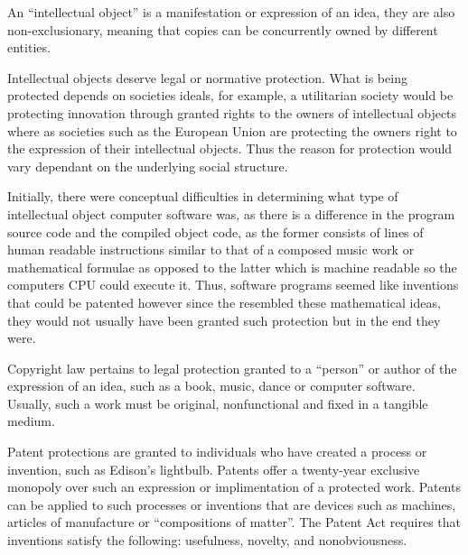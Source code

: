 An ``intellectual object'' is a manifestation or expression of an idea, they are also non-exclusionary, meaning that copies can be concurrently owned by different entities.



Intellectual objects deserve legal or normative protection. What is being protected depends on societies ideals, for example, a utilitarian society would be protecting innovation through granted rights to the owners of intellectual objects where as societies such as the European Union are protecting the owners right to the expression of their intellectual objects. Thus the reason for protection would vary dependant on the underlying social structure.



Initially, there were conceptual difficulties in determining what type of intellectual object computer software was, as there is a difference in the program source code and the compiled object code, as the former consists of lines of human readable instructions similar to that of a composed music work or mathematical formulae as opposed to the latter which is machine readable so the computers CPU could execute it. Thus, software programs seemed like inventions that could be patented however since the resembled these mathematical ideas, they would not usually have been granted such protection but in the end they were.



Copyright law pertains to legal protection granted to a ``person'' or author of the expression of an idea, such as a book, music, dance or computer software. Usually, such a work must be original, nonfunctional and fixed in a tangible medium.

Patent protections are granted to individuals who have created a process or invention, such as Edison's lightbulb. Patents offer a twenty-year exclusive monopoly over such an expression or implimentation of a protected work. Patents can be applied to such processes or inventions that are devices such as machines, articles of manufacture or ``compositions of matter''. The Patent Act requires that inventions satisfy the following: usefulness, novelty, and nonobviousness.

